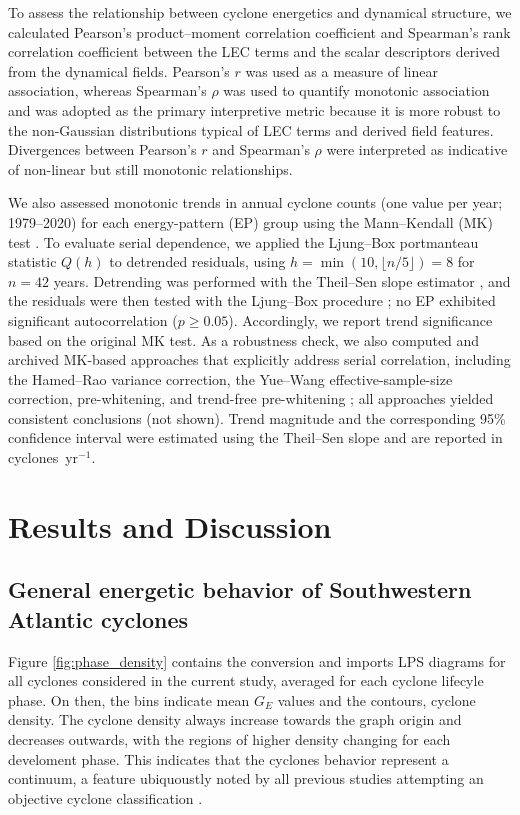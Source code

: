 \documentclass[pdflatex,sn-chicago]{sn-jnl}%
\theoremstyle{plain}
\theoremstyle{definition}
\theoremstyle{remark}
\theoremstyle{definition}
\begin{document}
To assess the relationship between cyclone energetics and dynamical structure, we calculated Pearson's product--moment correlation coefficient \citep{pearson1920notes} and Spearman's rank correlation coefficient \citep{spearman1987proof} between the LEC terms and the scalar descriptors derived from the dynamical fields. Pearson's \(r\) was used as a measure of linear association, whereas Spearman's \(\rho\) was used to quantify monotonic association and was adopted as the primary interpretive metric because it is more robust to the non-Gaussian distributions typical of LEC terms and derived field features. Divergences between Pearson's \(r\) and Spearman's \(\rho\) were interpreted as indicative of non-linear but still monotonic relationships. 

We also assessed monotonic trends in annual cyclone counts (one value per year; 1979--2020) for each energy-pattern (EP) group using the Mann--Kendall (MK) test \citep{mann1945nonparametric,kendall1948rank}. To evaluate serial dependence, we applied the Ljung--Box portmanteau statistic $Q(h)$ to detrended residuals, using $h=\min(10,\lfloor n/5\rfloor)=8$ for $n=42$ years. Detrending was performed with the Theil--Sen slope estimator \citep{sen1968estimates}, and the residuals were then tested with the Ljung--Box procedure \citep{ljung1978measure}; no EP exhibited significant autocorrelation ($p\ge 0.05$). Accordingly, we report trend significance based on the original MK test. As a robustness check, we also computed and archived MK-based approaches that explicitly address serial correlation, including the Hamed--Rao variance correction, the Yue--Wang effective-sample-size correction, pre-whitening, and trend-free pre-whitening \citep{KulkarniVonStorch1995,hamed1998modified,YueEtAl2002_TFPW,YueWang2004}; all approaches yielded consistent conclusions (not shown). Trend magnitude and the corresponding 95\% confidence interval were estimated using the Theil--Sen slope and are reported in cyclones~yr$^{-1}$.


\section{Results and Discussion}\label{sec:results}

\subsection{General energetic behavior of Southwestern Atlantic cyclones}

Figure \ref{fig:phase_density} contains the conversion and imports LPS diagrams for all cyclones considered in the current study, averaged for each cyclone lifecyle phase. On then, the bins indicate mean $G_E$ values and the contours, cyclone density. The cyclone density always increase towards the graph origin and decreases outwards, with the regions of higher density changing for each develoment phase. This indicates that the cyclones behavior represent a continuum, a feature ubiquoustly noted by all previous studies attempting an objective cyclone classification \citep[e.g.][]{hart2003cyclone,yanase2014parameter,graf2017objective,dekker2018characteristics,corner2025classification}.
\end{document}
